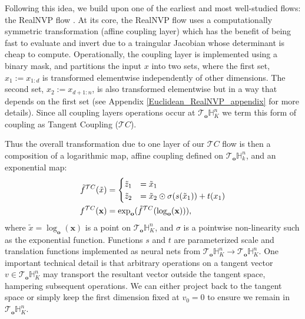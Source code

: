 Following this idea, we build upon one of the earliest and most well-studied flows: the RealNVP flow \cite{dinh2016density}. At its core, the RealNVP flow uses a computationally symmetric transformation (affine coupling layer) which has the benefit of being fast to evaluate and invert due to a traingular Jacobian whose determinant is cheap to compute. Operationally, the coupling layer is implemented using a binary mask, and partitions the input $x$ into two sets, where the first set, $x_1:=x_{1:d}$ is transformed elementwise independently of other dimensions. The second set, $x_2:=x_{d+1:n}$, is also transformed elementwise but in a way that depends on the first set (see Appendix \ref{Euclidean_RealNVP_appendix} for more details). Since all coupling layers operations occur at $\mathcal{T}_{\textbf{o}}\mathbb{H}^n_K$ we term this form of coupling as Tangent Coupling ($\mathcal{T}C$). 

Thus the overall transformation due to one layer of our $\mathcal{T}C$ flow is then a composition of a logarithmic map, affine coupling defined on $\mathcal{T}_{\textbf{o}}\mathbb{H}^n_k$, and an exponential map:
\begin{align}
    \label{eq:tangent_coupling}
     \tilde{f}^{\mathcal{T}C}(\tilde{x}) &=
     \begin{cases}
     \tilde{z}_{1} &= \tilde{x}_{1} \\
     \tilde{z}_{2} &= \tilde{x}_{2} \odot \sigma(s(\tilde{x}_{1})) + t(x_1) \nonumber
     \end{cases}\\
    f^{\mathcal{T}C}(\mathbf{x}) &= \textnormal{exp}_{\textbf{o}}(\tilde{f}^{\mathcal{T}C}(\log_{\textbf{o}}(\textbf{x}))),
\end{align}
where $\tilde{x} = \log_{\textbf{o}}(\textbf{x})$ is a point on $\mathcal{T}_{\textbf{o}}\mathbb{H}^n_K$, and $\sigma$ is a pointwise non-linearity such as the exponential function. Functions $s$ and $t$ are parameterized scale and translation functions implemented as neural nets from $\mathcal{T}_{\textbf{o}}\mathbb{H}^{n}_K \to \mathcal{T}_{\textbf{o}}\mathbb{H}^{n}_K$.
One important technical detail is that arbitrary operations on a tangent vector $v \in \mathcal{T}_{\textbf{o}}\mathbb{H}^n_K$ may transport the resultant vector outside the tangent space, hampering subsequent operations. We can either project back to the tangent space or simply keep the first dimension fixed at $v_0 = 0$ to ensure we remain in $\mathcal{T}_{\textbf{o}}\mathbb{H}^{n}_K$.

